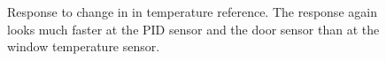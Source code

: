 \documentclass[12pt]{scrartcl}
\begin{document}
      \begin{figure}[H]
        \hspace{-40pt}
        \hspace{-20pt}
        \caption{Response to change in in temperature reference. The response
        again looks much faster at the PID sensor and the door sensor than at
        the window temperature sensor.}
        \label{fig14}
      \end{figure}
\end{document}
